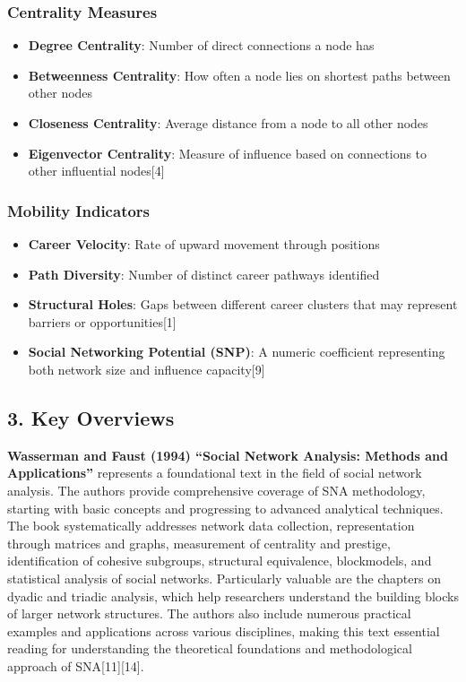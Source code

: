 \documentclass[
  letterpaper,
  DIV=11,
  numbers=noendperiod]{scrartcl}
\providecommand{\tightlist}{%
  \setlength{\itemsep}{0pt}\setlength{\parskip}{0pt}}
\begin{document}
\subsubsection{Centrality Measures}\label{centrality-measures}

\begin{itemize}
\tightlist
\item
  \textbf{Degree Centrality}: Number of direct connections a node has
\item
  \textbf{Betweenness Centrality}: How often a node lies on shortest
  paths between other nodes
\item
  \textbf{Closeness Centrality}: Average distance from a node to all
  other nodes
\item
  \textbf{Eigenvector Centrality}: Measure of influence based on
  connections to other influential nodes{[}4{]}
\end{itemize}

\subsubsection{Mobility Indicators}\label{mobility-indicators}

\begin{itemize}
\tightlist
\item
  \textbf{Career Velocity}: Rate of upward movement through positions
\item
  \textbf{Path Diversity}: Number of distinct career pathways identified
\item
  \textbf{Structural Holes}: Gaps between different career clusters that
  may represent barriers or opportunities{[}1{]}
\item
  \textbf{Social Networking Potential (SNP)}: A numeric coefficient
  representing both network size and influence capacity{[}9{]}
\end{itemize}

\subsection{3. Key Overviews}\label{key-overviews}

\textbf{Wasserman and Faust (1994) ``Social Network Analysis: Methods
and Applications''} represents a foundational text in the field of
social network analysis. The authors provide comprehensive coverage of
SNA methodology, starting with basic concepts and progressing to
advanced analytical techniques. The book systematically addresses
network data collection, representation through matrices and graphs,
measurement of centrality and prestige, identification of cohesive
subgroups, structural equivalence, blockmodels, and statistical analysis
of social networks. Particularly valuable are the chapters on dyadic and
triadic analysis, which help researchers understand the building blocks
of larger network structures. The authors also include numerous
practical examples and applications across various disciplines, making
this text essential reading for understanding the theoretical
foundations and methodological approach of SNA{[}11{]}{[}14{]}.
\end{document}
